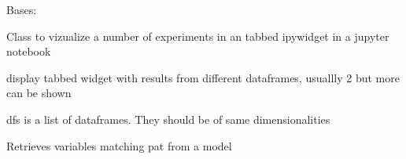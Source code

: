 \documentclass[letterpaper,10pt,english]{sphinxmanual}
\begin{document}

\begin{fulllineitems}
\label{\detokenize{jupyter/modeljupyter:modeljupyter.jupviz}}
\pysigstartsignatures
{}
\pysigstopsignatures
\sphinxAtStartPar
Bases: {\hyperref[\detokenize{jupyter/modeljupyter:modeljupyter.jup_keepviz}]{}}

\sphinxAtStartPar
Class to vizualize a number of experiments in an tabbed ipywidget in a jupyter notebook

\begin{fulllineitems}
\label{\detokenize{jupyter/modeljupyter:modeljupyter.jupviz.vis}}
\pysigstartsignatures
{}
\pysigstopsignatures
\sphinxAtStartPar
display tabbed widget with results from different dataframes, usuallly 2 but more can be shown

\sphinxAtStartPar
dfs is a list of dataframes. They should be of same dimensionalities

\end{fulllineitems}


\end{fulllineitems}


\begin{fulllineitems}
\label{\detokenize{jupyter/modeljupyter:modeljupyter.get_alt}}
\pysigstartsignatures
{}
\pysigstopsignatures
\sphinxAtStartPar
Retrieves variables matching pat from a model

\end{fulllineitems}
\end{document}
